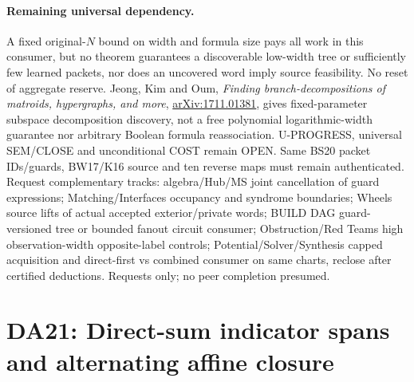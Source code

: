 \documentclass[11pt]{article}
\begin{document}
\paragraph{Remaining universal dependency.} A fixed original-$N$ bound on width and formula size pays all work in this consumer, but no theorem guarantees a discoverable low-width tree or sufficiently few learned packets, nor does an uncovered word imply source feasibility. No reset of aggregate reserve. Jeong, Kim and Oum, \emph{Finding branch-decompositions of matroids, hypergraphs, and more}, \href{https://arxiv.org/abs/1711.01381}{arXiv:1711.01381}, gives fixed-parameter subspace decomposition discovery, not a free polynomial logarithmic-width guarantee nor arbitrary Boolean formula reassociation. U-PROGRESS, universal SEM/CLOSE and unconditional COST remain OPEN. Same BS20 packet IDs/guards, BW17/K16 source and ten reverse maps must remain authenticated. Request complementary tracks: algebra/Hub/MS joint cancellation of guard expressions; Matching/Interfaces occupancy and syndrome boundaries; Wheels source lifts of actual accepted exterior/private words; BUILD DAG guard-versioned tree or bounded fanout circuit consumer; Obstruction/Red Teams high observation-width opposite-label controls; Potential/Solver/Synthesis capped acquisition and direct-first vs combined consumer on same charts, reclose after certified deductions. Requests only; no peer completion presumed.

\section{DA21: Direct-sum indicator spans and alternating affine closure}\label{sec:da21}
\end{document}
